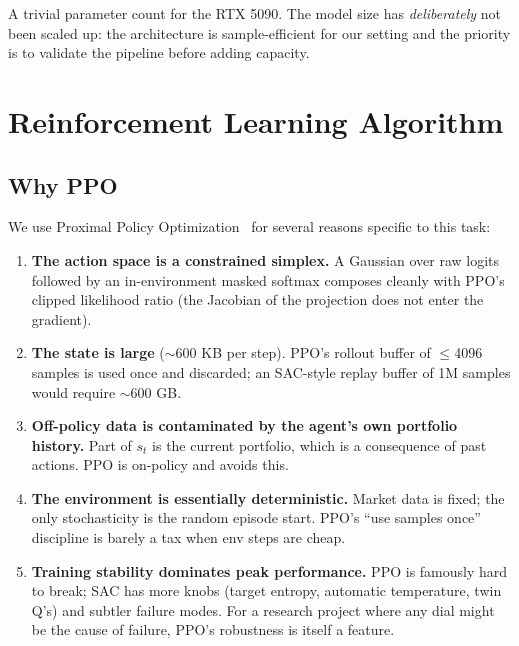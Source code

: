 \documentclass[11pt,a4paper]{article}
\begin{document}
A trivial parameter count for the RTX 5090. The model size has \emph{deliberately}
not been scaled up: the architecture is sample-efficient for our setting and the
priority is to validate the pipeline before adding capacity.

\section{Reinforcement Learning Algorithm}

\subsection{Why PPO}

We use Proximal Policy Optimization~\cite{schulman2017ppo} for several reasons
specific to this task:

\begin{enumerate}[leftmargin=*]
\item \textbf{The action space is a constrained simplex.} A Gaussian over raw logits
followed by an in-environment masked softmax composes cleanly with PPO's clipped
likelihood ratio (the Jacobian of the projection does not enter the gradient).

\item \textbf{The state is large} ($\sim$600 KB per step). PPO's rollout buffer of
$\le$4096 samples is used once and discarded; an SAC-style replay buffer of
1M samples would require $\sim$600 GB.

\item \textbf{Off-policy data is contaminated by the agent's own portfolio history.}
Part of $s_t$ is the current portfolio, which is a consequence of past actions. PPO
is on-policy and avoids this.

\item \textbf{The environment is essentially deterministic.} Market data is fixed;
the only stochasticity is the random episode start. PPO's ``use samples once''
discipline is barely a tax when env steps are cheap.

\item \textbf{Training stability dominates peak performance.} PPO is famously hard
to break; SAC has more knobs (target entropy, automatic temperature, twin Q's) and
subtler failure modes. For a research project where any dial might be the cause of
failure, PPO's robustness is itself a feature.
\end{enumerate}
\end{document}
